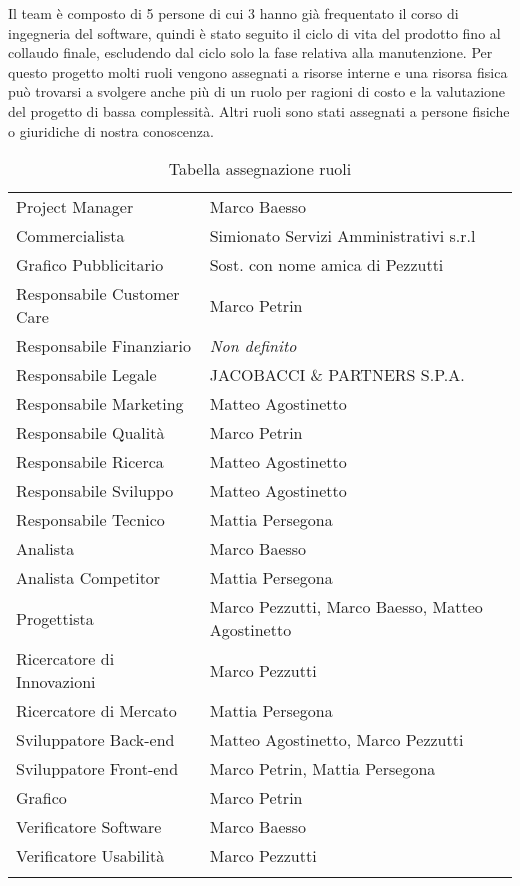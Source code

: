 Il team \`{e} composto di 5 persone di cui 3 hanno gi\`{a} frequentato il corso di ingegneria del 
software, quindi \`{e} stato seguito il ciclo di vita del prodotto fino al collaudo finale, escludendo dal ciclo solo la fase relativa alla manutenzione. Per questo progetto molti ruoli vengono assegnati a risorse interne e una risorsa fisica pu\`{o} trovarsi a svolgere anche pi\`{u} di un ruolo per ragioni di costo e la valutazione del progetto di bassa complessit\`{a}. Altri ruoli sono stati assegnati a persone fisiche o giuridiche di nostra conoscenza.

\begin{longtable}{|>{\centering}p{5cm}| >{\centering}m{9cm}|}
    \hline
    \multicolumn{1}{|c|}{\textbf{Ruolo}} &
    \multicolumn{1}{c|}{\textbf{Risorse assegnate}} \\ %
      \hline
		Project Manager & Marco Baesso \tabularnewline 
		Commercialista & Simionato Servizi Amministrativi s.r.l \tabularnewline 
		Grafico Pubblicitario & Sost. con nome amica di Pezzutti \tabularnewline 	 
		Responsabile Customer Care & Marco Petrin \tabularnewline 
		Responsabile Finanziario & \textit{Non definito} \tabularnewline 
		Responsabile Legale & JACOBACCI \& PARTNERS S.P.A.  \tabularnewline 
		Responsabile Marketing & Matteo Agostinetto  \tabularnewline 
		Responsabile Qualit\`{a} & Marco Petrin \tabularnewline 
		Responsabile Ricerca &  Matteo Agostinetto \tabularnewline 
		Responsabile Sviluppo & Matteo Agostinetto  \tabularnewline 
		Responsabile Tecnico & Mattia Persegona \tabularnewline 
		Analista & Marco Baesso \tabularnewline 
		Analista Competitor &  Mattia Persegona\tabularnewline 
		Progettista & Marco Pezzutti, Marco Baesso, Matteo Agostinetto \tabularnewline 
		Ricercatore di Innovazioni & Marco Pezzutti \tabularnewline 
		Ricercatore di Mercato & Mattia Persegona \tabularnewline 
		Sviluppatore Back-end & Matteo Agostinetto, Marco Pezzutti \tabularnewline 
		Sviluppatore Front-end & Marco Petrin, Mattia Persegona \tabularnewline 
		Grafico & Marco Petrin \tabularnewline 
		Verificatore Software & Marco Baesso \tabularnewline 
		Verificatore Usabilit\`{a} & Marco Pezzutti \tabularnewline 
        \hline
    \caption{Tabella assegnazione ruoli}
    \label{tab: Tabella assegnazione ruoli}
\end{longtable}